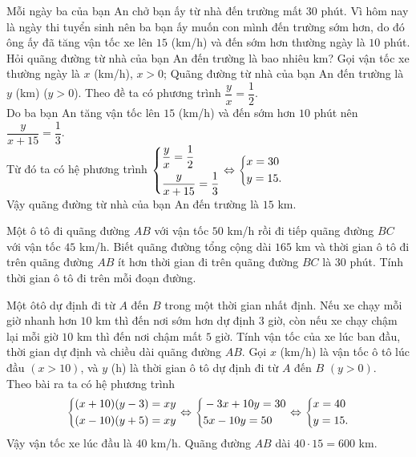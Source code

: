 \begin{vd}%
Mỗi ngày ba của bạn An chở bạn ấy từ nhà đến trường mất $30$ phút. Vì hôm nay là ngày thi tuyển sinh nên ba bạn ấy muốn con mình đến trường sớm hơn, do đó ông ấy đã tăng vận tốc xe lên $15$ (km/h) và đến sớm hơn thường ngày là $10$ phút. Hỏi quãng đường từ nhà của bạn An đến trường là bao nhiêu km?
\loigiai
{
	Gọi vận tốc xe thường ngày là $x$ (km/h), $x>0$; Quãng đường từ nhà của bạn An đến trường là $y$ (km) ($y>0$). Theo đề ta có phương trình $\dfrac{y}{x}=\dfrac{1}{2}$.\\
	Do ba bạn An tăng vận tốc lên $15$ (km/h) và đến sớm hơn $10$ phút nên $\dfrac{y}{x+15}=\dfrac{1}{3}$.\\
	Từ đó ta có hệ phương trình $\left\{\begin{aligned}&\dfrac{y}{x}=\dfrac{1}{2}\\&\dfrac{y}{x+15}=\dfrac{1}{3}\end{aligned}\right. \Leftrightarrow \left\{\begin{aligned}&x=30\\&y=15.\end{aligned}\right.$\\
	Vậy quãng đường từ nhà của bạn An đến trường là $15$ km.
}
\end{vd}

\begin{vd}
Một ô tô đi quãng đường $ AB $ với vận tốc  $50$ km/h rồi đi tiếp quãng đường $ BC $ với vận tốc  $45$ km/h.  Biết quãng đường tổng cộng dài  $165$ km  và thời gian ô tô đi trên quãng đường $ AB $ ít hơn thời gian đi trên quãng đường $ BC $ là $ 30 $ phút. Tính thời gian ô tô đi trên mỗi đoạn đường.
\end{vd}

\begin{vd}
Một ôtô dự định đi từ  $A$  đến  $B$  trong một thời gian nhất định. Nếu xe chạy mỗi giờ  nhanh hơn  $10$ km thì đến nơi sớm hơn dự định $ 3 $ giờ, còn nếu xe chạy chậm lại mỗi giờ  $10$ km  thì đến nơi chậm mất  $ 5 $ giờ. Tính vận tốc của xe lúc ban đầu, thời gian dự định và chiều dài quãng đường  $AB$.	
	\loigiai
	{
Gọi $ x $ (km/h) là vận tốc ô tô lúc đầu $ (x>10) $, và $ y $ (h) là thời gian ô tô dự định đi từ $ A $ đến $ B $ $ (y>0) $.\\
Theo bài ra ta có hệ phương trình 
\[\left\{\begin{aligned}&(x+10)(y-3)=xy\\&(x-10)(y+5)=xy\end{aligned}\right. \Leftrightarrow \left\{\begin{aligned}&-3x+10y=30\\&5x-10y=50\end{aligned}\right. \Leftrightarrow \left\{\begin{aligned}&x=40\\&y=15.\end{aligned}\right. \]
Vậy vận tốc xe lúc đầu là $ 40 $ km/h. Quãng đường $ AB $ dài $40 \cdot 15= 600 $ km.
	}
\end{vd}

